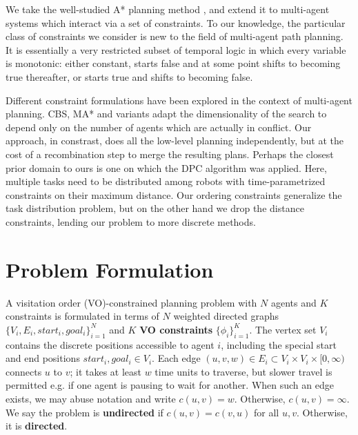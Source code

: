 \documentclass[letterpaper]{article}
\begin{document}
We take the well-studied A* planning method \cite{hart1968formal}, and extend it to multi-agent systems which interact via a set of constraints. To our knowledge, the particular class of constraints we consider is new to the field of multi-agent path planning. It is essentially a very restricted subset of temporal logic \cite{gabbay1994temporal} in which every variable is monotonic: either constant, starts false and at some point shifts to becoming true thereafter, or starts true and shifts to becoming false.

Different constraint formulations have been explored in the context of multi-agent planning. CBS, MA* and variants \cite{ferner2013odrm}\cite{sharon2015conflict}  adapt the dimensionality of the search to depend only on the number of agents which are actually in conflict. Our approach, in constrast, does all the low-level planning independently, but at the cost of a recombination step to merge the resulting plans. Perhaps the closest prior domain to ours is one on which the DPC algorithm \cite{bhattacharya2010multi} was applied. Here, multiple tasks need to be distributed among robots with time-parametrized constraints on their maximum distance. Our ordering constraints generalize the task distribution problem, but on the other hand we drop the distance constraints, lending our problem to more discrete methods.

\section{Problem Formulation}

A visitation order (VO)-constrained planning problem with $N$ agents and $K$ constraints is formulated in terms of $N$ weighted directed graphs $\{V_i,E_i,start_i,goal_i\}_{i=1}^N$ and $K$ \textbf{VO constraints} $\{\phi_i\}_{i=1}^K$. The vertex set $V_i$ contains the discrete positions accessible to agent $i$, including the special start and end positions $start_i,goal_i\in V_i$. Each edge $(u,v,w)\in E_i \subset V_i\times V_i\times [0,\infty)$ connects $u$ to $v$; it takes at least $w$ time units to traverse, but slower travel is permitted e.g. if one agent is pausing to wait for another. When such an edge exists, we may abuse notation and write $c(u,v) = w$. Otherwise, $c(u,v) = \infty$. We say the problem is \textbf{undirected} if $c(u,v) = c(v,u)$ for all $u,v$. Otherwise, it is \textbf{directed}.
\end{document}
